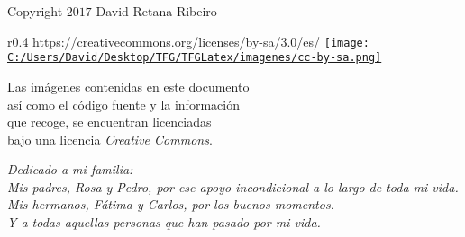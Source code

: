 \documentclass[10pt, a4paper, twoside]{report} %
\begin{document}





\newpage
\thispagestyle{empty} %
\null\vfill


\newpage
\thispagestyle{empty} %
\null\vfill


\textcopyright \hspace{0.3cm} Copyright $2017$ David Retana Ribeiro\\

\begin{wrapfigure}{r}{0.4\textwidth}
  \centering \url{https://creativecommons.org/licenses/by-sa/3.0/es/}
  \href{https://creativecommons.org/licenses/by-sa/3.0/es/}
       {\texttt{[image: C:/Users/David/Desktop/TFG/TFGLatex/imagenes/cc-by-sa.png]}}
\end{wrapfigure}
\noindent Las imágenes contenidas en este documento \\
así como el código fuente y la información \\
que recoge, se encuentran licenciadas \\
bajo una licencia \textit{Creative Commons}.

\clearpage


\begin{flushright}
  \textit{Dedicado a mi familia: \\
  Mis padres, Rosa y Pedro, por ese apoyo incondicional a lo largo de toda mi vida. \\
  Mis hermanos, Fátima y Carlos, por los buenos momentos.\\
  Y a todas aquellas personas que han pasado por mi vida.}
\end{flushright}
\end{document}
